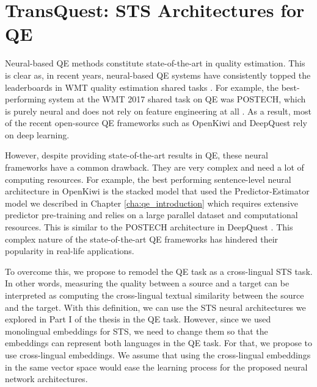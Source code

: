 \chapter{\label{cha:qe_transquest}TransQuest: STS Architectures for QE}

Neural-based QE methods constitute state-of-the-art in quality estimation. This is clear as, in recent years, neural-based QE systems have consistently topped the leaderboards in WMT quality estimation shared tasks  \autocite{kepler-etal-2019-openkiwi}. For example, the best-performing system at the WMT 2017 shared task on QE was \textsc{POSTECH}, which is purely neural and does not rely on feature engineering at all \autocite{kim-etal-2017-predictor}. As a result, most of the recent open-source QE frameworks such as OpenKiwi \autocite{kepler-etal-2019-openkiwi} and DeepQuest  \autocite{ive-etal-2018-deepquest} rely on deep learning. 

However, despite providing state-of-the-art results in QE, these neural frameworks have a common drawback. They are very complex and need a lot of computing resources. For example, the best performing sentence-level neural architecture in OpenKiwi \autocite{kepler-etal-2019-openkiwi} is the stacked model that used the Predictor-Estimator model we described in Chapter \ref{cha:qe_introduction} which requires extensive predictor pre-training and relies on a large parallel dataset and computational resources. This is similar to the \textsc{POSTECH} architecture in DeepQuest \autocite{ive-etal-2018-deepquest} . This complex nature of the state-of-the-art QE frameworks has hindered their popularity in real-life applications. 

To overcome this, we propose to remodel the QE task as a cross-lingual STS task. In other words, measuring the quality between a source and a target can be interpreted as computing the cross-lingual textual similarity between the source and the target. With this definition, we can use the STS neural architectures we explored in Part I of the thesis in the QE task. However, since we used monolingual embeddings for STS, we need to change them so that the embeddings can represent both languages in the QE task. For that, we propose to use cross-lingual embeddings. We assume that using the cross-lingual embeddings in the same vector space would ease the learning process for the proposed neural network architectures. 

